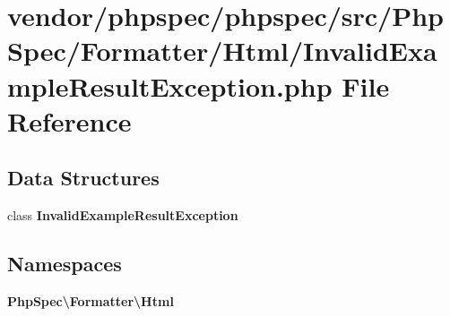 \section{vendor/phpspec/phpspec/src/\+Php\+Spec/\+Formatter/\+Html/\+Invalid\+Example\+Result\+Exception.php File Reference}
\label{_invalid_example_result_exception_8php}
\subsection*{Data Structures}
\begin{DoxyCompactItemize}
\item 
class {\bf Invalid\+Example\+Result\+Exception}
\end{DoxyCompactItemize}
\subsection*{Namespaces}
\begin{DoxyCompactItemize}
\item 
 {\bf Php\+Spec\textbackslash{}\+Formatter\textbackslash{}\+Html}
\end{DoxyCompactItemize}
